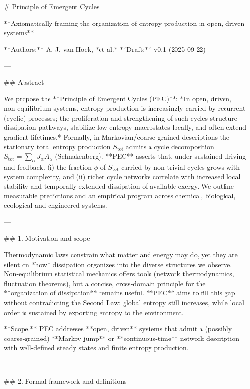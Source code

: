 
# Principle of Emergent Cycles

**Axiomatically framing the organization of entropy production in open, driven systems**

**Authors:** A. J. van Hoek, *et al.*
**Draft:** v0.1 (2025‑09‑22)

---

## Abstract

We propose the **Principle of Emergent Cycles (PEC)**: *In open, driven, non‑equilibrium systems, entropy production is increasingly carried by recurrent (cyclic) processes; the proliferation and strengthening of such cycles structure dissipation pathways, stabilize low‑entropy macrostates locally, and often extend gradient lifetimes.* Formally, in Markovian/coarse‑grained descriptions the stationary total entropy production $\dot S_{\mathrm{tot}}$ admits a cycle decomposition $\dot S_{\mathrm{tot}} = \sum_{\alpha} J_\alpha A_\alpha$ (Schnakenberg). **PEC** asserts that, under sustained driving and feedback, (i) the fraction $\phi$ of $\dot S_{\mathrm{tot}}$ carried by non‑trivial cycles grows with system complexity, and (ii) richer cycle networks correlate with increased local stability and temporally extended dissipation of available exergy. We outline measurable predictions and an empirical program across chemical, biological, ecological and engineered systems.

---

## 1. Motivation and scope

Thermodynamic laws constrain what matter and energy may do, yet they are silent on *how* dissipation organizes into the diverse structures we observe. Non‑equilibrium statistical mechanics offers tools (network thermodynamics, fluctuation theorems), but a concise, cross‑domain principle for the **organization of dissipation** remains useful. **PEC** aims to fill this gap without contradicting the Second Law: global entropy still increases, while local order is sustained by exporting entropy to the environment.

**Scope.** PEC addresses **open, driven** systems that admit a (possibly coarse‑grained) **Markov jump** or **continuous‑time** network description with well‑defined steady states and finite entropy production.

---

## 2. Formal framework and definitions

